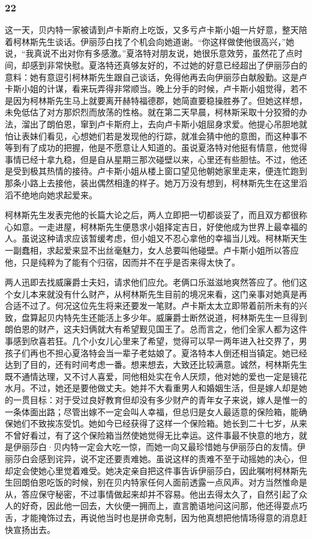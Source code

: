 \subsubsection*{22}

\par 这一天，贝内特一家被请到卢卡斯府上吃饭，又多亏卢卡斯小姐一片好意，整天陪着柯林斯先生谈话。伊丽莎白找了个机会向她道谢。“你这样做使他很高兴，”她说，“我真说不出对你有多感激。”夏洛特对朋友说，她很乐意效劳，虽然花了点时间，却感到非常快慰。夏洛特还真够友好的，不过她的好意已经超出了伊丽莎白的意料：她有意逗引柯林斯先生跟自己谈话，免得他再去向伊丽莎白献殷勤。这是卢卡斯小姐的计谋，看来玩弄得非常顺当。晚上分手的时候，卢卡斯小姐觉得，若不是因为柯林斯先生马上就要离开赫特福德郡，她简直要稳操胜券了。但她这样想，未免低估了对方那炽烈而放荡的性格。就在第二天早晨，柯林斯采取十分狡猾的办法，溜出了朗伯恩，窜到卢卡斯府上，去向卢卡斯小姐屈身求爱。他提心吊胆地就怕让表妹们看见，心想她们若是发现他的行踪，就准会猜中他的意图，而这种事不等到有了成功的把握，他是不愿意让人知道的。虽说夏洛特对他挺有情意，他觉得事情已经十拿九稳，但是自从星期三那次碰壁以来，心里还有些胆怯。不过，他还是受到极其热情的接待。卢卡斯小姐从楼上窗口望见他朝她家里走来，便连忙跑到那条小路上去接他，装出偶然相逢的样子。她万万没有想到，柯林斯先生在这里滔滔不绝地向她求起爱来。
\par 柯林斯先生发表完他的长篇大论之后，两人立即把一切都谈妥了，而且双方都很称心如意。一走进屋，柯林斯先生便恳求小姐择定吉日，好使他成为世界上最幸福的人。虽说这种请求应该暂缓考虑，但小姐又不忍心拿他的幸福当儿戏。柯林斯天生一副蠢相，求起爱来显不出丝毫魅力，女人总要叫他碰壁。卢卡斯小姐所以答应他，只是纯粹为了能有个归宿，因而并不在乎是否来得太快了。
\par 两人迅即去找威廉爵士夫妇，请求他们应允。老俩口乐滋滋地爽然答应了。他们这个女儿本来就没有什么财产，从柯林斯先生目前的境况来看，这门亲事对她真是再合适不过了。何况这位先生将来还要发一笔财。卢卡斯太太立即带着前所未有的兴致，盘算起贝内特先生还能活上多少年。威廉爵士断然说道，柯林斯先生一旦得到朗伯恩的财产，这夫妇俩就大有希望觐见国王了。总而言之，他们全家人都为这件事感到欣喜若狂。几个小女儿心里来了希望，觉得可以早一两年进入社交界了，男孩子们再也不担心夏洛特会当一辈子老姑娘了。夏洛特本人倒还相当镇定。她已经达到了目的，还有时间考虑一番。想来想去，大致还比较满意。诚然，柯林斯先生既不通情达理，又不讨人喜爱，同他相处实在令人厌烦，他对她的爱也一定是镜花水月。不过，她还是要他做丈夫。她并不大看重男人和婚姻生活，但是嫁人却是她的一贯目标：对于受过良好教育但却没有多少财产的青年女子来说，嫁人是惟一的一条体面出路；尽管出嫁不一定会叫人幸福，但总归是女人最适意的保险箱，能确保她们不致挨冻受饥。她如今已经获得了这样一个保险箱。她长到二十七岁，从来不曾好看过，有了这个保险箱当然使她觉得无比幸运。这件事最不快意的地方，就是伊丽莎白·贝内特一定会大吃一惊，而她一向又最珍惜她与伊丽莎白的友情。伊丽莎白会感到诧异，说不定还要责难她。虽说这样的责难不至于动摇她的决心，但却定会使她心里觉着难受。她决定亲自把这件事告诉伊丽莎白，因此嘱咐柯林斯先生回朗伯恩吃饭的时候，别在贝内特家任何人面前透露一点风声。对方当然惟命是从，答应保守秘密，不过事情做起来却并不容易。他出去得太久了，自然引起了众人的好奇，因此他一回去，大伙便一拥而上，直言脆语地问这问那，他还得耍点巧舌，才能掩饰过去，再说他当时也是拼命克制，因为他真想把他情场得意的消息赶快宣扬出去。
